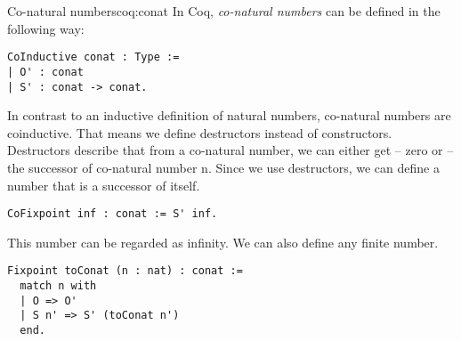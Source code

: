 \begin{coq}{Co-natural numbers}{coq:conat}
In Coq, \emph{co-natural numbers} can be defined in the following way:
\begin{verbatim}
CoInductive conat : Type := 
| O' : conat
| S' : conat -> conat.
\end{verbatim}
In contrast to an inductive definition of natural numbers, co-natural numbers are coinductive. That means we define destructors instead of constructors. Destructors describe that from a co-natural number, we can either get  -- zero or  -- the successor of co-natural number n. Since we use destructors, we can define a number that is a successor of itself.
\begin{verbatim}
CoFixpoint inf : conat := S' inf.
\end{verbatim}
This number can be regarded as infinity. We can also define any finite number.
\begin{verbatim}
Fixpoint toConat (n : nat) : conat :=
  match n with
  | O => O'
  | S n' => S' (toConat n') 
  end.
\end{verbatim}
\end{coq}
